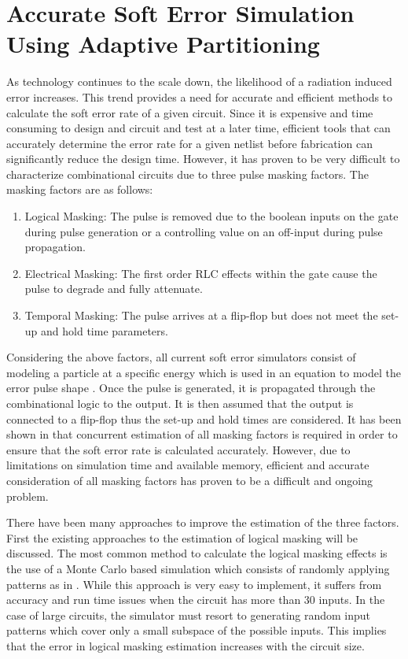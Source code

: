 \chapter{Accurate Soft Error Simulation Using Adaptive Partitioning} \label{ch3}

As technology continues to the scale down, the likelihood of a radiation induced error increases. This trend provides a need for accurate and efficient methods to calculate the soft error rate of a given circuit. Since it is expensive and time consuming to design and circuit and test at a later time, efficient tools that can accurately determine the error rate for a given netlist before fabrication can significantly reduce the design time. However, it has proven to be very difficult to characterize combinational circuits due to three pulse masking factors. The masking factors are as follows:

\begin{enumerate}
	\item Logical Masking: The pulse is removed due to the boolean inputs on the gate during pulse generation or a controlling value on an off-input during pulse propagation.
	
	\item Electrical Masking: The first order RLC effects within the gate cause the pulse to degrade and fully attenuate.
	
	\item Temporal Masking: The pulse arrives at a flip-flop but does not meet the set-up and hold time parameters. 
\end{enumerate}

Considering the above factors, all current soft error simulators consist of modeling a particle at a specific energy which is used in an equation to model the error pulse shape \cite{injeq}. Once the pulse is generated, it is propagated through the combinational logic to the output. It is then assumed that the output is connected to a flip-flop thus the set-up and hold times are considered. It has been shown in \cite{MARS_C,METSys} that concurrent estimation of all masking factors is required in order to ensure that the soft error rate is calculated accurately. However, due to limitations on simulation time and available memory, efficient and accurate consideration of all masking factors has proven to be a difficult and ongoing problem. 

There have been many approaches to improve the estimation of the three factors. First the existing approaches to the estimation of logical masking will be discussed. The most common method to calculate the logical masking effects is the use of a Monte Carlo based simulation which consists of randomly applying patterns as in \cite{Accurate_Masking,SERA,SEMM,PARAM_DESC,SETA_LA}. While this approach is very easy to implement, it suffers from accuracy and run time issues when the circuit has more than 30 inputs. In the case of large circuits, the simulator must resort to generating random input patterns which cover only a small subspace of the possible inputs. This implies that the error in logical masking estimation increases with the circuit size. 

